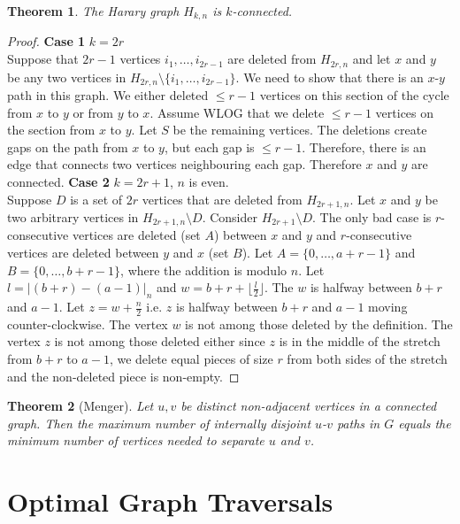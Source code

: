 \documentclass{article}
\newtheorem*{thm}{Theorem}
\theoremstyle{definition}
\begin{document}
\begin{thm}
The Harary graph $H_{k,n}$ is $k$-connected.
\end{thm}

\begin{proof}
\textbf{Case 1} $k=2r$ \\
Suppose that $2r-1$ vertices $i_1,\ldots,i_{2r-1}$ are deleted from $H_{2r,n}$ and let $x$ and $y$ be any two vertices in $H_{2r,n}\setminus \{i_1,\ldots,i_{2r-1}\}$.
We need to show that there is an $x$-$y$ path in this graph.
We either deleted $\le r-1$ vertices on this section of the cycle from $x$ to $y$ or from $y$ to $x$.
Assume WLOG that we delete $\le r-1$ vertices on the section from $x$ to $y$.
Let $S$ be the remaining vertices.
The deletions create gaps on the path from $x$ to $y$, but each gap is $\le r-1$.
Therefore, there is an edge that connects two vertices neighbouring each gap.
Therefore $x$ and $y$ are connected.
\textbf{Case 2} $k=2r+1$, $n$ is even. \\
Suppose $D$ is a set of $2r$ vertices that are deleted from $H_{2r+1,n}$.
Let $x$ and $y$ be two arbitrary vertices in $H_{2r+1,n}\setminus D$.
Consider $H_{2r+1}\setminus D$.
The only bad case is $r$-consecutive vertices are deleted (set $A$) between $x$ and $y$ and $r$-consecutive vertices are deleted between $y$ and $x$ (set $B$).
Let $A=\{0,\ldots,a+r-1\}$ and $B=\{0,\ldots,b+r-1\}$, where the addition is modulo $n$.
Let $l = |(b+r)-(a-1)|_n$ and $w = b+r + \lfloor \frac{l}{2}\rfloor$.
The $w$ is halfway between $b+r$ and $a-1$.
Let $z=w+\frac{n}{2}$ i.e. $z$ is halfway between $b+r$ and $a-1$ moving counter-clockwise.
The vertex $w$ is not among those deleted by the definition.
The vertex $z$ is not among those deleted either since $z$ is in the middle of the stretch from $b+r$ to $a-1$, we delete equal pieces of size $r$ from both sides of the stretch and the non-deleted piece is non-empty.
\end{proof}


\begin{thm}[Menger]
Let $u,v$ be distinct non-adjacent vertices in a connected graph.
Then the maximum number of internally disjoint $u$-$v$ paths in $G$ equals the minimum number of vertices needed to separate $u$ and $v$.
\end{thm}

\section{Optimal Graph Traversals}
\end{document}
